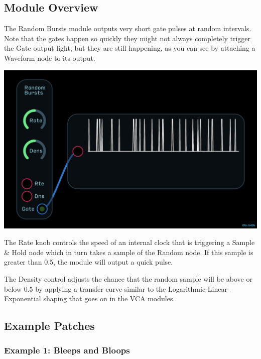 \documentclass[11pt]{book}
\begin{document}
\begin{multicols*}{2}

\subsection*{Module Overview}

The Random Bursts module outputs very short gate pulses at random intervals. Note that the gates happen so quickly they might not always completely trigger the Gate output light, but they are still happening, as you can see by attaching a Waveform node to its output.

\begin{center}
\includegraphics[width=0.95\linewidth]{random-bursts-fig1.png}
\end{center}

The Rate knob controls the speed of an internal clock that is triggering a Sample \& Hold node which in turn takes a sample of the Random node. If this sample is greater than 0.5, the module will output a quick pulse.

The Density control adjusts the chance that the random sample will be above or below 0.5 by applying a transfer curve similar to the Logarithmic-Linear-Exponential shaping that goes on in the VCA modules.

\subsection*{Example Patches}

\subsubsection*{Example 1: Bleeps and Bloops}


\end{multicols*}
\end{document}
